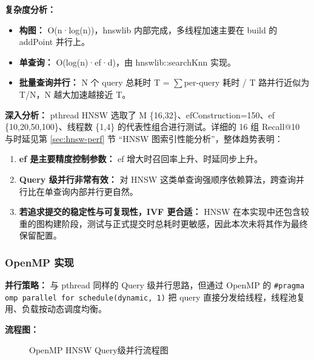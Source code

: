 \documentclass[a4paper]{article}
\begin{document}
\textbf{复杂度分析：}
\begin{itemize}
\item \textbf{构图：} O(n·log(n))，hnswlib 内部完成，多线程加速主要在 build 的 addPoint 并行上。
\item \textbf{单查询：} O(log(n)·ef·d)，由 hnswlib::searchKnn 实现。
\item \textbf{批量查询并行：} N 个 query 总耗时 T = $\sum$per-query 耗时 / T 路并行近似为 T/N，N 越大加速越接近 T。
\end{itemize}

\textbf{深入分析：} pthread HNSW 选取了 M \in \{16,32\}、efConstruction=150、ef \in \{10,20,50,100\}、线程数 \in \{1,4\} 的代表性组合进行测试。详细的 16 组 Recall@10 与时延见第 \ref{sec:hnsw-perf} 节 ``HNSW 图索引性能分析''，整体趋势表明：

\begin{enumerate}
\item \textbf{ef 是主要精度控制参数：} ef 增大时召回率上升、时延同步上升。
\item \textbf{Query 级并行非常有效：} 对 HNSW 这类单查询强顺序依赖算法，跨查询并行比在单查询内部并行更自然。
\item \textbf{若追求提交的稳定性与可复现性，IVF 更合适：} HNSW 在本实现中还包含较重的图构建阶段，测试与正式提交时总耗时更敏感，因此本次未将其作为最终保留配置。
\end{enumerate}

\subsubsection{OpenMP 实现}

\textbf{并行策略：} 与 pthread 同样的 Query 级并行思路，但通过 OpenMP 的 \texttt{\#pragma omp parallel for schedule(dynamic, 1)} 把 query 直接分发给线程，线程池复用、负载按动态调度均衡。

\textbf{流程图：}

\begin{figure}[htbp]
\centering
{}
\caption{OpenMP HNSW Query级并行流程图}
\end{figure}
\end{document}
